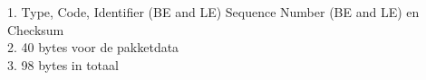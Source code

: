 1. Type, Code, Identifier (BE and LE) Sequence Number (BE and LE) en Checksum\\
2. 40 bytes voor de pakketdata\\
3. 98 bytes in totaal\\